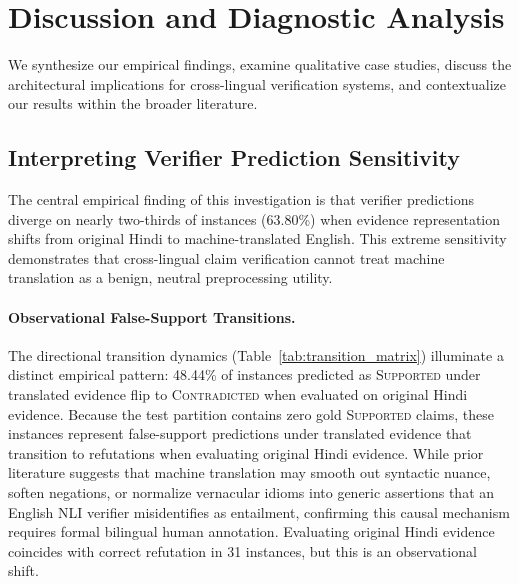 \section{Discussion and Diagnostic Analysis}
\label{sec:discussion}

We synthesize our empirical findings, examine qualitative case studies, discuss the architectural implications for cross-lingual verification systems, and contextualize our results within the broader literature.

\subsection{Interpreting Verifier Prediction Sensitivity}
The central empirical finding of this investigation is that verifier predictions diverge on nearly two-thirds of instances (63.80\%) when evidence representation shifts from original Hindi to machine-translated English. This extreme sensitivity demonstrates that cross-lingual claim verification cannot treat machine translation as a benign, neutral preprocessing utility.

\paragraph{Observational False-Support Transitions.}
The directional transition dynamics (Table~\ref{tab:transition_matrix}) illuminate a distinct empirical pattern: 48.44\% of instances predicted as \textsc{Supported} under translated evidence flip to \textsc{Contradicted} when evaluated on original Hindi evidence. Because the test partition contains zero gold \textsc{Supported} claims, these instances represent false-support predictions under translated evidence that transition to refutations when evaluating original Hindi evidence. While prior literature suggests that machine translation may smooth out syntactic nuance, soften negations, or normalize vernacular idioms into generic assertions that an English NLI verifier misidentifies as entailment, confirming this causal mechanism requires formal bilingual human annotation. Evaluating original Hindi evidence coincides with correct refutation in 31 instances, but this is an observational shift.


